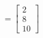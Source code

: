 \documentclass[preview]{standalone}
\begin{document}
\begin{align*}
= \begin{bmatrix} 2 \\ 8 \\ 10 \end{bmatrix}
\end{align*}
\end{document}
